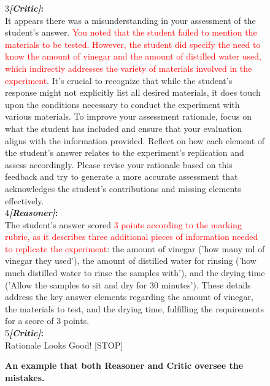 \begin{figure*}
\begin{tcolorbox}[
    colback=gray!10,      %
    colframe=gray!80,     %
    title=Case Study 3,
    fonttitle=\bfseries,  %
    rounded corners,
    boxrule=0.5mm,        %
    width=\linewidth
]
\textcircled{\raisebox{-0.3pt} {\scriptsize3}}\textbf{\emph{[Critic]}:}\\
 It appears there was a misunderstanding in your assessment of the student's answer. \textcolor{red}{You noted that the student failed to mention the materials to be tested. However, the student did specify the need to know the amount of vinegar and the amount of distilled water used, which indirectly addresses the variety of materials involved in the experiment}. It's crucial to recognize that while the student's response might not explicitly list all desired materials, it does touch upon the conditions necessary to conduct the experiment with various materials. To improve your assessment rationale, focus on what the student has included and ensure that your evaluation aligns with the information provided. Reflect on how each element of the student's answer relates to the experiment's replication and assess accordingly. Please revise your rationale based on this feedback and try to generate a more accurate assessment that acknowledges the student's contributions and missing elements effectively.\\
\textcircled{\raisebox{-0.3pt} {\scriptsize4}}\textbf{\emph{[Reasoner]}:}\\
 The student's answer scored \textcolor{red}{3 points according to the marking rubric, as it describes three additional pieces of information needed to replicate the experiment}: the amount of vinegar ('how many ml of vinegar they used'), the amount of distilled water for rinsing ('how much distilled water to rinse the samples with'), and the drying time ('Allow the samples to sit and dry for 30 minutes'). These details address the key answer elements regarding the amount of vinegar, the materials to test, and the drying time, fulfilling the requirements for a score of 3 points.\\
\textcircled{\raisebox{-0.3pt} {\scriptsize5}}\textbf{\emph{[Critic]}:}\\
 Rationale Looks Good! [STOP]
\end{tcolorbox}
\caption{\textbf{An example that both Reasoner and Critic oversee the mistakes.}}
\label{box:error_1}
\end{figure*}



